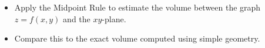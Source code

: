 \begin{activity}
  \begin{itemize}
    \item Apply the Midpoint Rule to estimate the volume between the graph
      $z=f(x,y)$ and the $xy$-plane.  
    \item Compare this to the exact volume computed using simple
      geometry.
    \end{itemize}

    \ea

\end{activity}


\aftera
